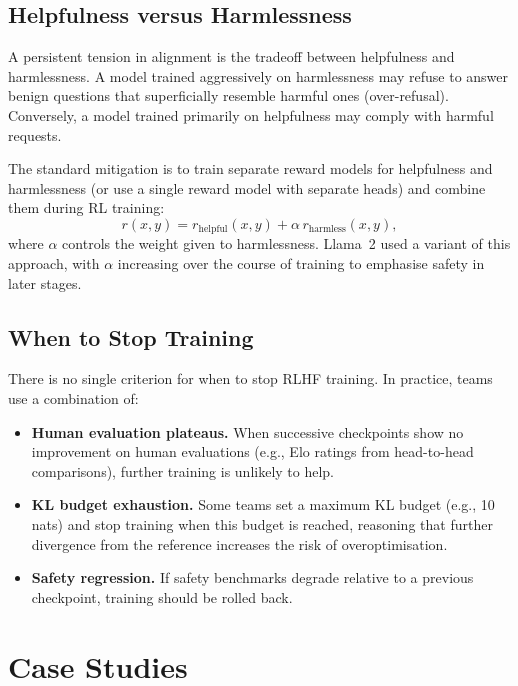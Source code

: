 \subsection{Helpfulness versus Harmlessness}

A persistent tension in alignment is the tradeoff between helpfulness and harmlessness. A model trained aggressively on harmlessness may refuse to answer benign questions that superficially resemble harmful ones (over-refusal). Conversely, a model trained primarily on helpfulness may comply with harmful requests.

The standard mitigation is to train separate reward models for helpfulness and harmlessness (or use a single reward model with separate heads) and combine them during RL training:
\[
r(x, y) = r_{\text{helpful}}(x, y) + \alpha\,r_{\text{harmless}}(x, y),
\]
where $\alpha$ controls the weight given to harmlessness. Llama~2 used a variant of this approach, with $\alpha$ increasing over the course of training to emphasise safety in later stages.

\subsection{When to Stop Training}
\label{sec:when-stop}

There is no single criterion for when to stop RLHF training. In practice, teams use a combination of:
\begin{itemize}[leftmargin=*]
  \item \textbf{Human evaluation plateaus.} When successive checkpoints show no improvement on human evaluations (e.g., Elo ratings from head-to-head comparisons), further training is unlikely to help.
  \item \textbf{KL budget exhaustion.} Some teams set a maximum KL budget (e.g., 10 nats) and stop training when this budget is reached, reasoning that further divergence from the reference increases the risk of overoptimisation.
  \item \textbf{Safety regression.} If safety benchmarks degrade relative to a previous checkpoint, training should be rolled back.
\end{itemize}

\section{Case Studies}
\label{sec:case-studies}

